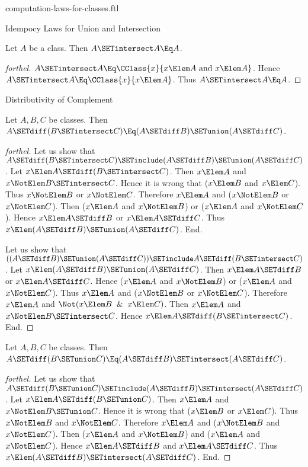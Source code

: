 \documentclass{stex}
\begin{document}
\begin{smodule}{computation-laws-for-classes.ftl}
\begin{sfragment}{Idempocy Laws for Union and Intersection}
  \begin{proposition}[forthel]
    Let $A$ be a class.
    Then $A \SETintersect A \Eq A$.
  \end{proposition}
  \begin{proof}[forthel]
    $A \SETintersect A \Eq \CClass{x}{x \Elem A\text{ and }x \Elem A}$.
    Hence $A \SETintersect A \Eq \CClass{x}{x \Elem A}$.
    Thus $A \SETintersect A \Eq A$.
  \end{proof}
\end{sfragment}

\begin{sfragment}{Distributivity of Complement}
  \begin{proposition}[forthel]
    Let $A, B, C$ be classes.
    Then $A \SETdiff (B \SETintersect C) \Eq (A \SETdiff B) \SETunion (A \SETdiff C)$.
  \end{proposition}
  \begin{proof}[forthel]
    Let us show that $A \SETdiff (B \SETintersect C) \SETinclude (A \SETdiff B) \SETunion (A \SETdiff C)$.
      Let $x \Elem A \SETdiff (B \SETintersect C)$.
      Then $x \Elem A$ and $x \NotElem B \SETintersect C$.
      Hence it is wrong that ($x \Elem B$ and $x \Elem C$).
      Thus $x \NotElem B$ or $x \NotElem C$.
      Therefore $x \Elem A$ and ($x \NotElem B$ or $x \NotElem C$).
      Then ($x \Elem A$ and $x \NotElem B$) or ($x \Elem A$ and $x \NotElem C$).
      Hence $x \Elem A \SETdiff B$ or $x \Elem A \SETdiff C$.
      Thus $x \Elem (A \SETdiff B) \SETunion (A \SETdiff C)$.
    End.

    Let us show that $((A \SETdiff B) \SETunion (A \SETdiff C)) \SETinclude A \SETdiff (B \SETintersect C)$. %
      Let $x \Elem (A \SETdiff B) \SETunion (A \SETdiff C)$.
      Then $x \Elem A \SETdiff B$ or $x \Elem A \SETdiff C$.
      Hence ($x \Elem A$ and $x \NotElem B$) or ($x \Elem A$ and $x \NotElem C$).
      Thus $x \Elem A$ and ($x \NotElem B$ or $x \NotElem C$).
      Therefore $x \Elem A$ and $\Not(x \Elem B \And x \Elem C)$.
      Then $x \Elem A$ and $x \NotElem B \SETintersect C$.
      Hence $x \Elem A \SETdiff (B \SETintersect C)$.
    End.
  \end{proof}

  \begin{proposition}[forthel]
    Let $A, B, C$ be classes.
    Then $A \SETdiff (B \SETunion C) \Eq (A \SETdiff B) \SETintersect (A \SETdiff C)$.
  \end{proposition}
  \begin{proof}[forthel]
    Let us show that $A \SETdiff (B \SETunion C) \SETinclude (A \SETdiff B) \SETintersect (A \SETdiff C)$.
      Let $x \Elem A \SETdiff (B \SETunion C)$.
      Then $x \Elem A$ and $x \NotElem B \SETunion C$.
      Hence it is wrong that ($x \Elem B$ or $x \Elem C$).
      Thus $x \NotElem B$ and $x \NotElem C$.
      Therefore $x \Elem A$ and ($x \NotElem B$ and $x \NotElem C$).
      Then ($x \Elem A$ and $x \NotElem B$) and ($x \Elem A$ and $x \NotElem C$).
      Hence $x \Elem A \SETdiff B$ and $x \Elem A \SETdiff C$.
      Thus $x \Elem (A \SETdiff B) \SETintersect (A \SETdiff C)$.
    End.


\end{proof}
\end{sfragment}
\end{smodule}
\end{document}
